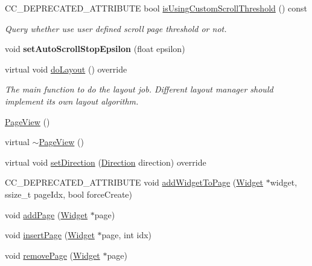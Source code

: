 \begin{DoxyCompactItemize}
C\+C\+\_\+\+D\+E\+P\+R\+E\+C\+A\+T\+E\+D\+\_\+\+A\+T\+T\+R\+I\+B\+U\+TE bool \hyperlink{classui_1_1PageView_a8c41a825d4f568fc6b9e5968c8ecfb71}{is\+Using\+Custom\+Scroll\+Threshold} () const
\begin{DoxyCompactList}\small\item\em Query whether use user defined scroll page threshold or not. \end{DoxyCompactList}\item 
\mbox{\label{classui_1_1PageView_a174b4b1a791416501a9ce513209e4799}} 
void {\bfseries set\+Auto\+Scroll\+Stop\+Epsilon} (float epsilon)
\item 
\mbox{\label{classui_1_1PageView_a329ad925f4e28750faa1ed4747adfd82}} 
virtual void \hyperlink{classui_1_1PageView_a329ad925f4e28750faa1ed4747adfd82}{do\+Layout} () override
\begin{DoxyCompactList}\small\item\em The main function to do the layout job. Different layout manager should implement its own layout algorithm. \end{DoxyCompactList}\item 
\hyperlink{classui_1_1PageView_a5b0ef1346c9a4c504162111bd668a826}{Page\+View} ()
\item 
virtual \hyperlink{classui_1_1PageView_a7a6747406aba5a13a3240807317f8bae}{$\sim$\+Page\+View} ()
\item 
virtual void \hyperlink{classui_1_1PageView_a4ac6e8672026f60e326ffc054d167365}{set\+Direction} (\hyperlink{classui_1_1ScrollView_aed2d778ae8098dcafe323b2beae8dd6b}{Direction} direction) override
\item 
C\+C\+\_\+\+D\+E\+P\+R\+E\+C\+A\+T\+E\+D\+\_\+\+A\+T\+T\+R\+I\+B\+U\+TE void \hyperlink{classui_1_1PageView_a340533ea140300c4ca00cd0c3d8e9b85}{add\+Widget\+To\+Page} (\hyperlink{classui_1_1Widget}{Widget} $\ast$widget, ssize\+\_\+t page\+Idx, bool force\+Create)
\item 
void \hyperlink{classui_1_1PageView_afc6dc3519137860e93f4e777dc172874}{add\+Page} (\hyperlink{classui_1_1Widget}{Widget} $\ast$page)
\item 
void \hyperlink{classui_1_1PageView_ae1909f7baa4a2e38f1a90f24c428db2d}{insert\+Page} (\hyperlink{classui_1_1Widget}{Widget} $\ast$page, int idx)
\item 
void \hyperlink{classui_1_1PageView_afc0653451f8a57c9cb2f7b14eabe1c1f}{remove\+Page} (\hyperlink{classui_1_1Widget}{Widget} $\ast$page)

\end{DoxyCompactItemize}

